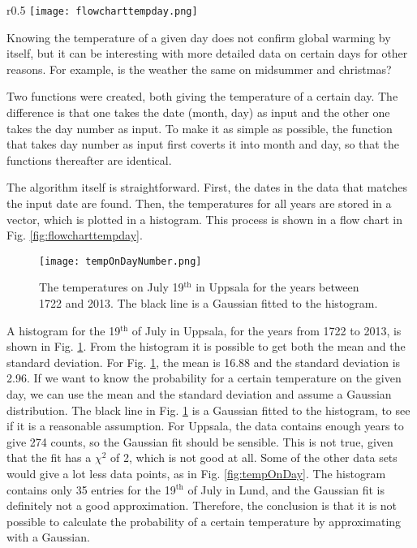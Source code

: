 

\begin{wrapfigure}{r}{0.5\textwidth}
\centering
\texttt{[image: flowcharttempday.png]}
\caption{\label{fig:flowcharttempday} Flow chart for the function that gives the temperature of a given day.}
\end{wrapfigure}

Knowing the temperature of a given day does not confirm global warming by itself, but it can be interesting with more detailed data on certain days for other reasons. For example, is the weather the same on midsummer and christmas? 

Two functions were created, both giving the temperature of a certain day. The difference is that one takes the date (month, day) as input and the other one takes the day number as input. To make it as simple as possible, the function that takes day number as input first coverts it into month and day, so that the functions thereafter are identical. 

The algorithm itself is straightforward. First, the dates in the data that matches the input date are found. Then, the temperatures for all years are stored in a vector, which is plotted in a histogram. This process is shown in a flow chart in Fig. \ref{fig:flowcharttempday}. 

\begin{figure}[ht]
\begin{center}
\texttt{[image: tempOnDayNumber.png]}
\caption{\label{fig:tempOnDayNumber} The temperatures on July 19$^{\text{th}}$ in Uppsala for the years between 1722 and 2013. The black line is a Gaussian fitted to the histogram.}
\end{center}
\end{figure}

A histogram for the 19$^{\text{th}}$ of July in Uppsala, for the years from 1722 to 2013, is shown in Fig. \ref{fig:tempOnDayNumber}. From the histogram it is possible to get both the mean and the standard deviation. For Fig. \ref{fig:tempOnDayNumber}, the mean is 16.88 and the standard deviation is 2.96. If we want to know the probability for a certain temperature on the given day, we can use the mean and the standard deviation and assume a Gaussian distribution. The black line in Fig. \ref{fig:tempOnDayNumber} is a Gaussian fitted to the histogram, to see if it is a reasonable assumption. For Uppsala, the data contains enough years to give 274 counts, so the Gaussian fit should be sensible. This is not true, given that the fit has a $\chi ^2$ of 2, which is not good at all. Some of the other data sets would give a lot less data points, as in Fig. \ref{fig:tempOnDay}. The histogram contains only 35 entries for the 19$^{\text{th}}$ of July in Lund, and the Gaussian fit is definitely not a good approximation. Therefore, the conclusion is that it is not possible to calculate the probability of a certain temperature by approximating with a Gaussian.

